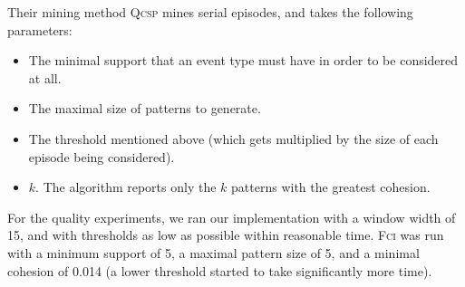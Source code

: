Their mining method \textsc{Qcsp} mines serial episodes, and takes the following parameters:
\begin{itemize}
\item The minimal support that an event type must have in order to be considered at all.
\item The maximal size of patterns to generate.
\item The threshold mentioned above (which gets multiplied by the size of each episode being considered).
\item $ k $. The algorithm reports only the $ k $ patterns with the greatest cohesion.
\end{itemize}

For the quality experiments, we ran our implementation with a window width of 15, and with thresholds as low as possible within reasonable time. \textsc{Fci} was run with a minimum support of 5, a maximal pattern size of 5, and a minimal cohesion of 0.014 (a lower threshold started to take significantly more time).

